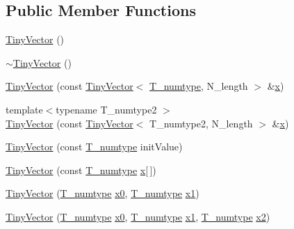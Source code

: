 \subsection*{Public Member Functions}
\begin{DoxyCompactItemize}
\item 
\hyperlink{classTinyVector_adab8554f53e1a366ecb89ee21a296c0b}{Tiny\+Vector} ()
\item 
\hyperlink{classTinyVector_a7274fce49f2067df72f2306015284032}{$\sim$\+Tiny\+Vector} ()
\item 
\hyperlink{classTinyVector_a7d6f6a1f5ea0e2de3c8244d91b13d3b2}{Tiny\+Vector} (const \hyperlink{classTinyVector}{Tiny\+Vector}$<$ \hyperlink{classTinyVector_ab8e7df758dd5a369e92b3cb54a48bdbe}{T\+\_\+numtype}, N\+\_\+length $>$ \&\hyperlink{vecnorm1_8cc_ac73eed9e41ec09d58f112f06c2d6cb63}{x})
\item 
{\footnotesize template$<$typename T\+\_\+numtype2 $>$ }\\\hyperlink{classTinyVector_a7a67a6dc97b3498960785be5c9b5a65d}{Tiny\+Vector} (const \hyperlink{classTinyVector}{Tiny\+Vector}$<$ T\+\_\+numtype2, N\+\_\+length $>$ \&\hyperlink{vecnorm1_8cc_ac73eed9e41ec09d58f112f06c2d6cb63}{x})
\item 
\hyperlink{classTinyVector_a78911596eae6bf0ea81094cd7c6598f0}{Tiny\+Vector} (const \hyperlink{classTinyVector_ab8e7df758dd5a369e92b3cb54a48bdbe}{T\+\_\+numtype} init\+Value)
\item 
\hyperlink{classTinyVector_a56ab707986f243178d588671b9f5930e}{Tiny\+Vector} (const \hyperlink{classTinyVector_ab8e7df758dd5a369e92b3cb54a48bdbe}{T\+\_\+numtype} \hyperlink{vecnorm1_8cc_ac73eed9e41ec09d58f112f06c2d6cb63}{x}\mbox{[}$\,$\mbox{]})
\item 
\hyperlink{classTinyVector_ac32907fd075ee37dd7a6d83d92d6f647}{Tiny\+Vector} (\hyperlink{classTinyVector_ab8e7df758dd5a369e92b3cb54a48bdbe}{T\+\_\+numtype} \hyperlink{gendata_8m_aa48da42c617fdb7cf84e9a3f80aa04e8}{x0}, \hyperlink{classTinyVector_ab8e7df758dd5a369e92b3cb54a48bdbe}{T\+\_\+numtype} \hyperlink{gendata_8m_ac39b33361203e68d7820336db48d45e6}{x1})
\item 
\hyperlink{classTinyVector_adb3681f289aeb468ec00ff9d79911aac}{Tiny\+Vector} (\hyperlink{classTinyVector_ab8e7df758dd5a369e92b3cb54a48bdbe}{T\+\_\+numtype} \hyperlink{gendata_8m_aa48da42c617fdb7cf84e9a3f80aa04e8}{x0}, \hyperlink{classTinyVector_ab8e7df758dd5a369e92b3cb54a48bdbe}{T\+\_\+numtype} \hyperlink{gendata_8m_ac39b33361203e68d7820336db48d45e6}{x1}, \hyperlink{classTinyVector_ab8e7df758dd5a369e92b3cb54a48bdbe}{T\+\_\+numtype} \hyperlink{gendata_8m_aab2463cd078f7c5368f6eb80f5a549b8}{x2})

\end{DoxyCompactItemize}
